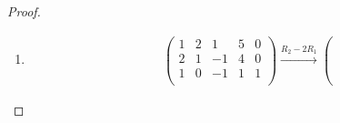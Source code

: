 \documentclass[prb,12pt]{revtex4-2}
\theoremstyle{definition}
\theoremstyle{definition}
\newenvironment{parts}{\begin{enumerate}[label=(\alph*)]}{\end{enumerate}}
\begin{document}
\begin{proof}
\begin{parts}
\begin{gather*}
\begin{array}{cccc|c}
 1 & 2 & 1 & 5 & -38 \\
 0 & 1 & 1 & 2 & -10 \\
 0 & 0 & 0 & 0 & 0 \\
\end{array}
\right)\\ \xrightarrow{R_1-2R_2} \left(
\begin{array}{cccc|c}
 1 & 0 & -1 & 1 & -18 \\
 0 & 1 & 1 & 2 & -10 \\
 0 & 0 & 0 & 0 & 0 \\
\end{array}
\right)
	\end{gather*}

	\begin{align*}
		x_1-x_3+x_4=&-18\\
		x_2+x_3+2x_4=&-10
	\end{align*}	
	Deswegen ist $\text{L\"{o}s}(A,b)$ 
	\begin{align*}
		\begin{pmatrix} -18+x_3-x_4\\-10-x_3-2x_4 \\ x_3 \\ x_4 \end{pmatrix} =& \begin{pmatrix} -18 \\ -10 \\ 0 \\ 0 \end{pmatrix} +x_3\begin{pmatrix} 1 \\ -1 \\ 1 \\ 0 \end{pmatrix} +x_4 \begin{pmatrix} -1 \\ -2 \\ 0 \\ 1 \end{pmatrix} 
	\end{align*}
\item 
	\begin{align*}
\left(
\begin{array}{cccc|c}
 1 & 2 & 1 & 5 & 0 \\
 2 & 1 & -1 & 4 & 0 \\
 1 & 0 & -1 & 1 & 1 \\
\end{array}
\right) \xrightarrow{R_2-2R_1} \left(

\end{align*}
\end{parts}
\end{proof}
\end{document}
